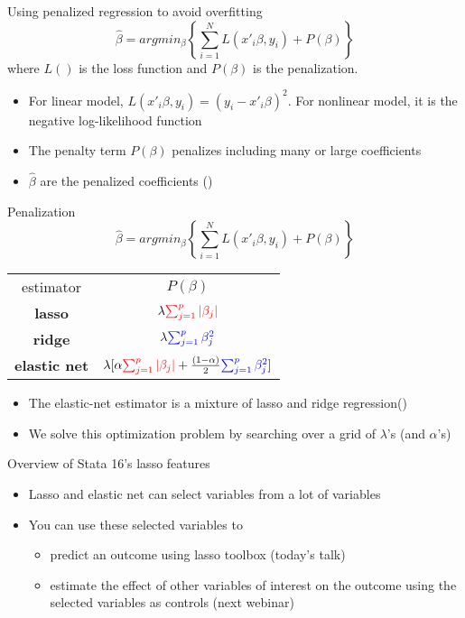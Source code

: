 \documentclass{beamer}
\begin{document}
\begin{frame}{Using penalized regression to avoid overfitting}
	\label{penalized regression}
	$$\hat{\beta}=argmin_\beta\left\lbrace\sum_{i=1}^{N}L(x'_i\beta,y_i)+P(\beta)\right\rbrace$$
	where $L()$ is the loss function and $P(\beta)$ is the penalization.
	
	\begin{itemize}
		\item For linear model, $L(x'_i\beta, y_i ) = (y_i − x'_i\beta)^2$. For nonlinear model, it is the negative log-likelihood function
		\item The penalty term $P(\beta)$ penalizes including many or large coefficients
		\item $\hat{\beta}$ are the penalized coefficients (\hyperlink{prediction example}{})
	\end{itemize}
\end{frame}	

\begin{frame}{Penalization}
	$$\hat{\beta}=argmin_\beta\left\lbrace\sum_{i=1}^{N}L(x'_i\beta,y_i)+P(\beta)\right\rbrace$$
	\centering
	\begin{tabular}{cc}
		\toprule
		estimator&$P(\beta)$\\
		\textbf{lasso}&$\lambda{\color{red}\sum_{j=1}^{p}|\beta_j|}$\\
		\textbf{ridge}&$\lambda{\color{blue}\sum_{j=1}^{p}\beta_j^2}$\\
		\textbf{elastic net}&$\lambda[\alpha{\color{red}\sum_{j=1}^{p}|\beta_j|}+\frac{(1-\alpha)}{2}{\color{blue}\sum_{j=1}^{p}\beta_j^2}]$\\
		\bottomrule
	\end{tabular}
	\begin{itemize}
		\item The elastic-net estimator is a mixture of lasso and ridge regression(\hyperlink{elastic-net example}{})
		\item We solve this optimization problem by searching over a grid of $\lambda$’s (and $\alpha$’s)
	\end{itemize}
\end{frame}	

\begin{frame}{Overview of Stata 16's lasso features}
	\begin{itemize}
		\item Lasso and elastic net can select variables from a lot of variables
		\item You can use these selected variables to
		\begin{itemize}
			\item predict an outcome using lasso toolbox (today’s talk)
			\item estimate the effect of other variables of interest on the outcome using the selected variables as controls (next webinar)
		\end{itemize}
	\end{itemize}
\end{frame}
\end{document}
